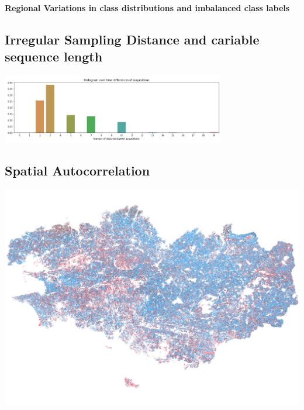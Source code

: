 \documentclass[a0]{tumposter}
\begin{document}
\begin{minipage}[t]{0.32\textwidth}
%	

	\textbf{Regional Variations in class distributions and imbalanced class labels}
	
	
	
%	
%			
%	
%
%	
	\subsection{Irregular Sampling Distance and cariable sequence length}
	
	\includegraphics[width=\textwidth, height=3cm]{images/days_between_acquisitions}
	
	\subsection{Spatial Autocorrelation}
	 
	 \includegraphics[width=.66\textwidth]{images/map/breizh}
	 

\end{minipage}
\end{document}
